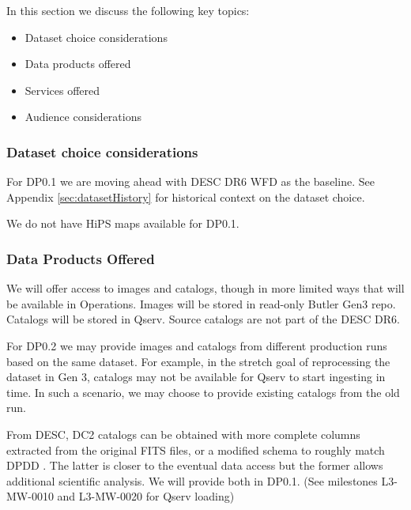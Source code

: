 In this section we discuss the following key topics:

\begin{itemize}

\item Dataset choice considerations

\item Data products offered

\item Services offered

\item Audience considerations

\end{itemize}

\subsubsection {Dataset choice considerations} \label{sec:dataset}

For DP0.1 we are moving ahead with DESC DR6 WFD as the baseline.
See Appendix \ref{sec:datasetHistory} for historical context on the dataset choice.


We do not have  HiPS maps available for DP0.1.



\subsubsection{Data Products Offered}

We will offer access to images and catalogs, though in more limited ways that will be available in Operations.
Images will be stored in read-only Butler Gen3 repo.
Catalogs will be stored in Qserv. Source catalogs are not part of the DESC DR6.

For DP0.2 we may provide images and catalogs from different production runs based on the same dataset.
For example, in the stretch goal of reprocessing the dataset in Gen 3, catalogs may not be available for Qserv to start ingesting in time. In such a scenario, we may choose to provide existing catalogs from the old run.

From DESC, DC2 catalogs can be obtained with more complete columns extracted from the original FITS files, or a modified schema to roughly match DPDD .
The latter is closer to the eventual data access but the former allows additional scientific analysis.
We will provide both in DP0.1. (See milestones L3-MW-0010 and L3-MW-0020 for Qserv loading)

